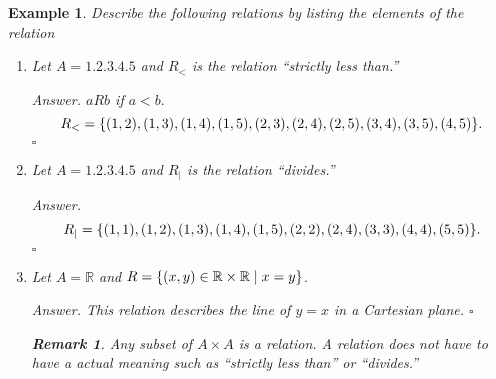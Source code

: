 \documentclass[12pt,a4paper]{article}
\newtheorem{eg}{Example}[subsection]
\newenvironment*{ans}{\par{\textit{Answer. }}}{\hfill{$\square$}\par}
\newtheorem*{rmk}{\indent Remark}
\def\R{{\mathbb{R}}}
\begin{document}
\begin{eg}
Describe the following relations by listing the elements of the relation
\begin{enumerate}
	\item Let $A=\qty{1,2,3,4,5}$ and $R_<$ is the relation ``strictly less than.''
	\begin{ans}
		$aRb$ if $a<b.$ \[R_<=\qty{(1,2),(1,3),(1,4),(1,5),(2,3),(2,4),(2,5),(3,4),(3,5),(4,5)}.\]	
	\end{ans}
	\item Let $A=\qty{1,2,3,4,5}$ and $R_\mid$ is the relation ``divides.''
	\begin{ans}
		\[R_\mid=\qty{(1,1),(1,2),(1,3),(1,4),(1,5),(2,2),(2,4),(3,3),(4,4),(5,5)}.\]	
	\end{ans}
	\item Let $A=\R$ and $R=\qty{(x,y)\in\R\times\R\mid x=y}$.
	\begin{ans}
		This relation describes the line of $y=x$ in a Cartesian plane.	
	\end{ans}
	\begin{rmk}
		Any subset of $A\times A$ is a relation. A relation does not have to have a actual meaning such as ``strictly less than'' or ``divides.''	
	\end{rmk}
\end{enumerate}	
\end{eg}
\end{document}
